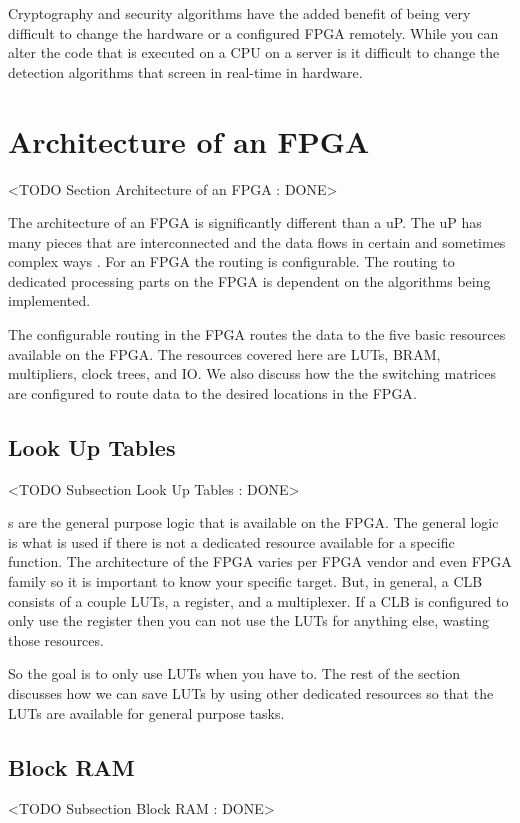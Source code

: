 Cryptography and security algorithms have the added benefit of being very difficult to change the hardware or a configured \ac{FPGA} remotely. While you can alter the code that is executed on a \ac{CPU} on a server is it difficult to change the detection algorithms that screen in real-time in hardware. 

\section{Architecture of an FPGA}
	<TODO Section Architecture of an FPGA : DONE>

The architecture of an \ac{FPGA} is significantly different than a \ac{uP}. The \ac{uP} has many pieces that are interconnected and the data flows in certain and sometimes complex ways \cite{furber1996arm}. For an \ac{FPGA} the routing is configurable. The routing to dedicated processing parts on the \ac{FPGA} is dependent on the algorithms being implemented. 

The configurable routing in the \ac{FPGA} routes the data to the five basic resources available on the \ac{FPGA}. The resources covered here are \ac{LUT}s, \ac{BRAM}, multipliers, clock trees, and \ac{IO}. We also discuss how the the switching matrices are configured to route data to the desired locations in the \ac{FPGA}.

\subsection{Look Up Tables}
	<TODO Subsection Look Up Tables : DONE>

s are the general purpose logic that is available on the \ac{FPGA}. The general logic is what is used if there is not a dedicated resource available for a specific function. The architecture of the \ac{FPGA} varies per \ac{FPGA} vendor and even \ac{FPGA} family so it is important to know your specific target. But, in general, a \ac{CLB} consists of a couple \ac{LUT}s, a register, and a multiplexer. If a \ac{CLB} is configured to only use the register then you can not use the \ac{LUT}s for anything else, wasting those resources. 

So the goal is to only use \ac{LUT}s when you have to. The rest of the section discusses how we can save \ac{LUT}s by using other dedicated resources so that the \ac{LUT}s are available for general purpose tasks.	
	
\subsection{Block RAM}
	<TODO Subsection Block RAM : DONE>
	
